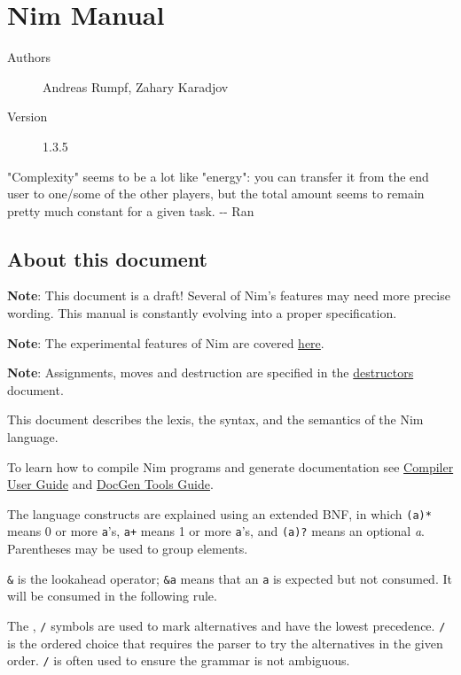 \hypertarget{nim-manual}{%
\section{Nim Manual}\label{nim-manual}}

\begin{description}
\item[Authors]
Andreas Rumpf, Zahary Karadjov
\item[Version]
1.3.5
\end{description}

"Complexity" seems to be a lot like "energy": you can transfer it from
the end user to one/some of the other players, but the total amount
seems to remain pretty much constant for a given task. -\/- Ran

\hypertarget{about-this-document}{%
\subsection{About this document}\label{about-this-document}}

\textbf{Note}: This document is a draft! Several of Nim's features may
need more precise wording. This manual is constantly evolving into a
proper specification.

\textbf{Note}: The experimental features of Nim are covered
\href{manual_experimental.html}{here}.

\textbf{Note}: Assignments, moves and destruction are specified in the
\href{destructors.html}{destructors} document.

This document describes the lexis, the syntax, and the semantics of the
Nim language.

To learn how to compile Nim programs and generate documentation see
\href{nimc.html}{Compiler User Guide} and \href{docgen.html}{DocGen
Tools Guide}.

The language constructs are explained using an extended BNF, in which
\texttt{(a)*} means 0 or more \texttt{a}'s, \texttt{a+} means 1 or more
\texttt{a}'s, and \texttt{(a)?} means an optional \emph{a}. Parentheses
may be used to group elements.

\texttt{\&} is the lookahead operator; \texttt{\&a} means that an
\texttt{a} is expected but not consumed. It will be consumed in the
following rule.

The \texttt{\textbar{}}, \texttt{/} symbols are used to mark
alternatives and have the lowest precedence. \texttt{/} is the ordered
choice that requires the parser to try the alternatives in the given
order. \texttt{/} is often used to ensure the grammar is not ambiguous.


